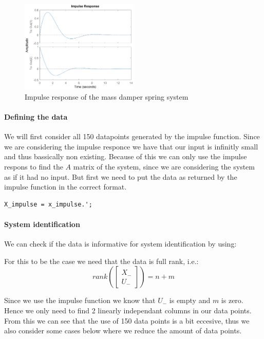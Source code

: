\begin{figure}[H]
	\centering
	\includegraphics[width=0.5\textwidth]{Latex/image/ex-msd/impulse.eps}
	\caption{Impulse response of the mass damper spring system}
\end{figure}

\paragraph{Defining the data}
We will first consider all 150 datapoints generated by the impulse function. Since we are considering the impulse responce we have that our input is infinitly small and thus bassically non existing. Because of this we can only use the impulse respons to find the $A$ matrix of the system, since we are considering the system as if it had no input. But first we need to put the data as returned by the impulse function in the correct format.
\begin{lstlisting}
X_impulse = x_impulse.';
\end{lstlisting}

\paragraph{System identification}
We can check if the data is informative for system identification by using:
\begin{center}
\end{center}
For this to be the case we need that the data is full rank, i.e.:
\[ rank\left( \begin{bmatrix}
X_- \\ U_-
\end{bmatrix} \right) = n + m\]

Since we use the impulse function we know that $U_-$ is empty and $m$ is zero. Hence we only need to find 2 linearly independant columns in our data points. From this we can see that the use of 150 data points is a bit eccesive, thus we also consider some cases below where we reduce the amount of data points.

